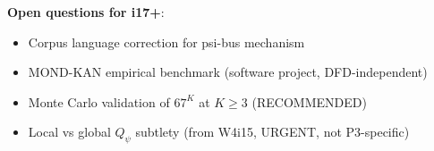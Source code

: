 \documentclass[11pt]{article}
\theoremstyle{definition}
\theoremstyle{remark}
\begin{document}
\begin{tcolorbox}[colback=green!5!white, colframe=green!60!black,
  title=\textbf{P3 STATUS after W4i16}]
\textbf{Open questions for i17+}:
\begin{itemize}[nosep]
  \item Corpus language correction for psi-bus mechanism
  \item MOND-KAN empirical benchmark (software project, DFD-independent)
  \item Monte Carlo validation of $67^K$ at $K \geq 3$ (RECOMMENDED)
  \item Local vs global $Q_\psi$ subtlety (from W4i15, URGENT, not P3-specific)
\end{itemize}

\end{tcolorbox}
\end{document}
